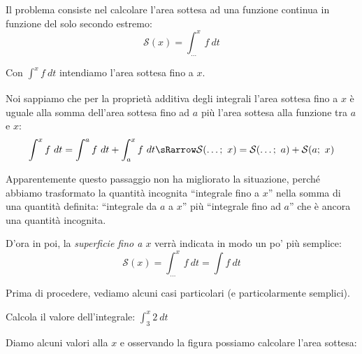Il problema consiste nel calcolare l'area sottesa ad una funzione continua in 
funzione del solo secondo estremo:
\[\mathcal{S}(x) = \int_{\dots}^x f~dt \] %

Con \(\int_{}^x f~dt\) intendiamo l'area sottesa fino a \(x\).

Noi sappiamo che per la proprietà additiva degli integrali l'area sottesa 
fino a \(x\) è uguale alla somma dell'area sottesa fino ad \(a\) più l'area 
sottesa alla funzione tra \(a\) e \(x\):
\[\int_{}^x f~dt = \int_{}^a f~dt + \int_{a}^x f~dt \sRarrow
  \mathcal{S}(\dots ;~x) = \mathcal{S}(\dots ;~a) + \mathcal{S}(a;~x)\]

Apparentemente questo passaggio non ha migliorato la situazione, perché 
abbiamo trasformato la quantità incognita ``integrale fino a \(x\)'' nella 
somma di una quantità definita: ``integrale da \(a\) a \(x\)'' più 
``integrale fino ad \(a\)'' che è ancora una quantità incognita.

D'ora in poi, la \emph{superficie fino a \(x\)} verrà indicata in modo un 
po' più semplice:
\[\mathcal{S}(x) = \int_{\dots}^x f~dt = \int f~dt\]


Prima di procedere, vediamo alcuni casi particolari (e particolarmente 
semplici).
\begin{esempio}
Calcola il valore dell'integrale: \(\displaystyle \int_3^x 2~dt\)

Diamo alcuni valori alla \(x\) e osservando la figura possiamo calcolare 
l'area sottesa:

\end{esempio}


